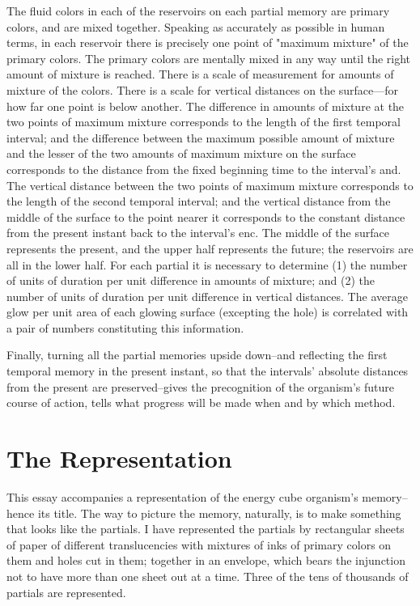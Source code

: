 \documentclass[10pt,twoside]{memoir}
\begin{document}
\begin{enumerate}
{\begin{enumerate}
\begin{sysrules}
\begin{sysrules}
\begin{sysrules}
\begin{sysrules}
{\begin{enumerate}
The fluid colors in each of the reservoirs on each partial memory are 
primary colors, and are mixed together. Speaking as accurately as possible in 
human terms, in each reservoir there is precisely one point of "maximum 
mixture" of the primary colors. The primary colors are mentally mixed in 
any way until the right amount of mixture is reached. There is a scale of 
measurement for amounts of mixture of the colors. There is a scale for 
vertical distances on the surface---for how far one point is below another. The 
difference in amounts of mixture at the two points of maximum mixture 
corresponds to the length of the first temporal interval; and the difference 
between the maximum possible amount of mixture and the lesser of the two 
amounts of maximum mixture on the surface corresponds to the distance 
from the fixed beginning time to the interval's and. The vertical distance 
between the two points of maximum mixture corresponds to the length of 
the second temporal interval; and the vertical distance from the middle of 
the surface to the point nearer it corresponds to the constant distance from 
the present instant back to the interval's enc. The middle of the surface 
represents the present, and the upper half represents the future; the 
reservoirs are all in the lower half. For each partial it is necessary to 
determine (1) the number of units of duration per unit difference in 
amounts of mixture; and (2) the number of units of duration per unit 
difference in vertical distances. The average glow per unit area of each 
glowing surface (excepting the hole) is correlated with a pair of numbers 
constituting this information. 

Finally, turning all the partial memories upside down--and reflecting the 
first temporal memory in the present instant, so that the intervals' absolute 
distances from the present are preserved--gives the precognition of the 
organism's future course of action, tells what progress will be made when 
and by which method. 


\section*{The Representation}

This essay accompanies a representation of the energy cube organism's 
memory--hence its title. The way to picture the memory, naturally, is to 
make something that looks like the partials. I have represented the partials 
by rectangular sheets of paper of different translucencies with mixtures of 
inks of primary colors on them and holes cut in them; together in an 
envelope, which bears the injunction not to have more than one sheet out at 
a time. Three of the tens of thousands of partials are represented. 



\end{enumerate}}
\end{sysrules}
\end{sysrules}
\end{sysrules}
\end{sysrules}
\end{enumerate}}
\end{enumerate}
\end{document}
